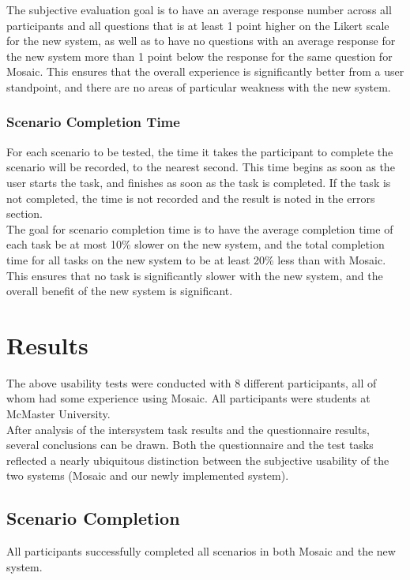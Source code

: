 \documentclass[10pt]{article}
\begin{document}
\begin{multicols}{2}
The subjective evaluation goal is to have an average response number across all participants and all questions that is at least 1 point higher on the Likert scale for the new system, as well as to have no questions with an average response for the new system more than 1 point below the response for the same question for Mosaic. This ensures that the overall experience is significantly better from a user standpoint, and there are no areas of particular weakness with the new system.

\subsubsection*{Scenario Completion Time}
For each scenario to be tested, the time it takes the participant to complete the scenario will be recorded, to the nearest second. This time begins as soon as the user starts the task, and finishes as soon as the task is completed. If the task is not completed, the time is not recorded and the result is noted in the errors section.\\

The goal for scenario completion time is to have the average completion time of each task be at most 10\% slower on the new system, and the total completion time for all tasks on the new system to be at least 20\% less than with Mosaic. This ensures that no task is significantly slower with the new system, and the overall benefit of the new system is significant.

\section*{Results}
The above usability tests were conducted with 8 different participants, all of whom had some experience using Mosaic. All participants were students at McMaster University.\\

After analysis of the intersystem task results and the questionnaire results, several conclusions can be drawn. Both the questionnaire and the test tasks reflected a nearly ubiquitous distinction between the subjective usability of the two systems (Mosaic and our newly implemented system).

\subsection*{Scenario Completion}
All participants successfully completed all scenarios in both Mosaic and the new system.


\end{multicols}
\end{document}
